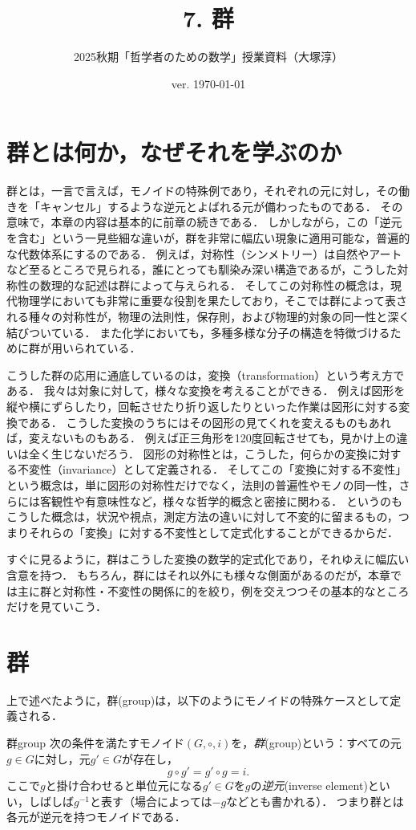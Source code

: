 \documentclass[11pt,a4paper, dvipdfmx]{jsarticle}
\begin{document}
\title{7. 群}
\author{2025秋期「哲学者のための数学」授業資料（大塚淳）}
\date{ver. \today}
\maketitle

\section{群とは何か，なぜそれを学ぶのか}
群とは，一言で言えば，モノイドの特殊例であり，それぞれの元に対し，その働きを「キャンセル」するような逆元とよばれる元が備わったものである．
その意味で，本章の内容は基本的に前章の続きである．
しかしながら，この「逆元を含む」という一見些細な違いが，群を非常に幅広い現象に適用可能な，普遍的な代数体系にするのである．
例えば，対称性（シンメトリー）は自然やアートなど至るところで見られる，誰にとっても馴染み深い構造であるが，こうした対称性の数理的な記述は群によって与えられる．
そしてこの対称性の概念は，現代物理学においても非常に重要な役割を果たしており，そこでは群によって表される種々の対称性が，物理の法則性，保存則，および物理的対象の同一性と深く結びついている．
また化学においても，多種多様な分子の構造を特徴づけるために群が用いられている．

こうした群の応用に通底しているのは，変換（transformation）という考え方である．
我々は対象に対して，様々な変換を考えることができる．
例えば図形を縦や横にずらしたり，回転させたり折り返したりといった作業は図形に対する変換である．
こうした変換のうちにはその図形の見てくれを変えるものもあれば，変えないものもある．
例えば正三角形を120度回転させても，見かけ上の違いは全く生じないだろう．
図形の対称性とは，こうした，何らかの変換に対する不変性（invariance）として定義される．
そしてこの「変換に対する不変性」という概念は，単に図形の対称性だけでなく，法則の普遍性やモノの同一性，さらには客観性や有意味性など，様々な哲学的概念と密接に関わる．
というのもこうした概念は，状況や視点，測定方法の違いに対して不変的に留まるもの，つまりそれらの「変換」に対する不変性として定式化することができるからだ．

すぐに見るように，群はこうした変換の数学的定式化であり，それゆえに幅広い含意を持つ．
もちろん，群にはそれ以外にも様々な側面があるのだが，本章では主に群と対称性・不変性の関係に的を絞り，例を交えつつその基本的なところだけを見ていこう．


\section{群}
上で述べたように，群(group)は，以下のようにモノイドの特殊ケースとして定義される．
\begin{dfn}{群}{group}
    次の条件を満たすモノイド$(G, \circ, i)$を，\emph{群}(group)という：すべての元$g \in G$に対し，元$g' \in G$が存在し，
    \[ g \circ g' = g' \circ g = i.\]
    ここで$g$と掛け合わせると単位元になる$g' \in G$を$g$の\emph{逆元}(inverse element)といい，しばしば$g^{-1}$と表す（場合によっては$-g$などとも書かれる）．
    つまり群とは各元が逆元を持つモノイドである．
\end{dfn}    
\end{document}

